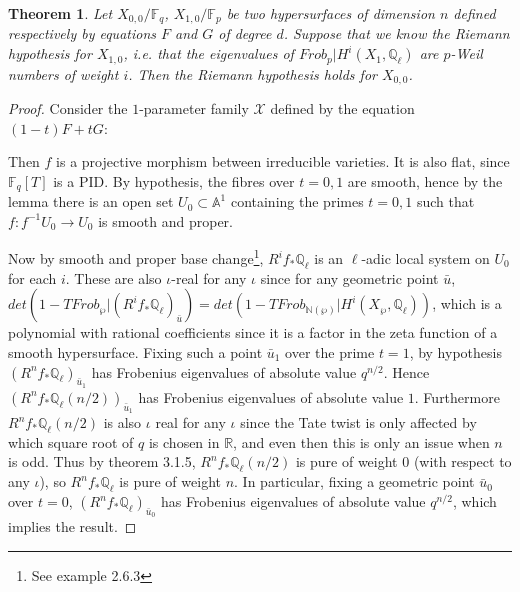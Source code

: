 \documentclass{ucbthesis}
\newtheorem{thm}{Theorem}[section]
\theoremstyle{definition}
\theoremstyle{theorem}
\begin{document}
\begin{thm}
Let $X_{0,0}/\mathbb{F}_{q}$, $X_{1,0}/\mathbb{F}_{p}$ be two hypersurfaces of dimension $n$ defined respectively by equations $F$ and $G$ of degree $d$. Suppose that we know the Riemann hypothesis for $X_{1,0}$, i.e. that the eigenvalues of $Frob_{p}|H^{i}(X_1,\mathbb{Q}_{\ell})$ are $p$-Weil numbers of weight $i$. Then the Riemann hypothesis holds for $X_{0,0}$. 
\end{thm}

\begin{proof}
Consider the $1$-parameter family $\mathcal{X}$ defined by the equation $(1-t)F + tG$:
\begin{center}
\end{center}
Then $f$ is a projective morphism between irreducible varieties. It is also flat, since $\mathbb{F}_{q}[T]$ is a PID. By hypothesis, the fibres over $t=0,1$ are smooth, hence by the lemma there is an open set $U_{0}\subset \mathbb{A}^{1}$ containing the primes $t=0,1$ such that $f:f^{-1}U_{0}\rightarrow U_{0}$ is smooth and proper.  

Now by smooth and proper base change\footnote{See example 2.6.3}, $R^{i}f_{*}\mathbb{Q}_{\ell}$ is an $\ell$-adic local system on $U_{0}$
 for each $i$. These are also $\iota$-real for any $\iota$ since for any geometric point $\bar{u}$, $det(1-TFrob_{\wp}|(R^{i}f_{*}\mathbb{Q}_{\ell})_{\bar{u}}) = det(1-TFrob_{\mathbb{N}(\wp)}|H^{i}(X_{\wp},\mathbb{Q}_{\ell}))$, which is a polynomial with rational coefficients since it is a factor in the zeta
  function of a smooth hypersurface. Fixing such a point $\bar{u}_{1}$ over the prime $t=1$, by hypothesis
   $(R^{n}f_{*}\mathbb{Q}_{\ell})_{\bar{u}_1}$ has Frobenius eigenvalues of absolute value $q^{n/2}$. Hence 
    $(R^{n}f_{*}\mathbb{Q}_{\ell}(n/2))_{\bar{u}_1}$ has Frobenius eigenvalues of absolute value $1$. Furthermore $R^{n}f_{*}\mathbb{Q}_{\ell}(n/2)$ is also $\iota$ real for any $\iota$ since the Tate twist is only affected by which square root of $q$ is chosen in $\mathbb{R}$, and even then this is only an issue when
        $n$ is odd. Thus by
     theorem 3.1.5, $R^{n}f_{*}\mathbb{Q}_{\ell}(n/2)$ is pure of weight $0$ (with respect to any $\iota$), so 
      $R^{n}f_{*}\mathbb{Q}_{\ell}$ is pure of weight $n$. In particular, fixing a geometric point $\bar{u}_0$ over $t=0$, $(R^{n}f_{*}\mathbb{Q}_{\ell})_{\bar{u}_0}$ has Frobenius eigenvalues of absolute value $q^{n/2}$, which implies the result.
\end{proof}
\end{document}
